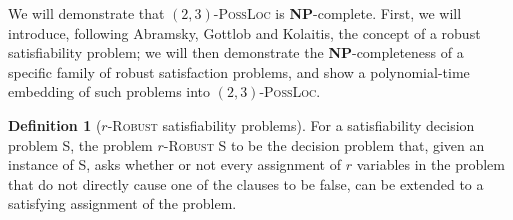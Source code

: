 \documentclass[reprint]{revtex4-1}
\theoremstyle{definition}
\newtheorem{defn}{Definition}
\begin{document}
We will demonstrate that $(2,3)$-\textsc{PossLoc} is \textbf{NP}-complete. First, we will introduce, following Abramsky, Gottlob and Kolaitis, the concept of a robust satisfiability problem; we will then demonstrate the \textbf{NP}-completeness of a specific family of robust satisfaction problems, and show a polynomial-time embedding of such problems into $(2,3)$-\textsc{PossLoc}.

\begin{defn}[$r$-\textsc{Robust} satisfiability problems]	
For a satisfiability decision problem \textsc{S}, the problem $r$-\textsc{Robust S} to be the decision problem that, given an instance of \textsc{S}, asks whether or not every assignment of $r$ variables in the problem that do not directly cause one of the clauses to be false, can be extended to a satisfying assignment of the problem.
\end{defn}
\end{document}
